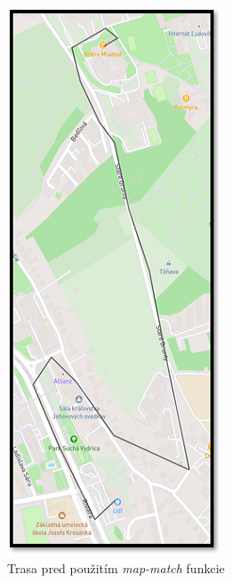 \begin{figure}[H]
    \centering
    \begin{subfigure}{0.45\textwidth}
        \centering
        \includegraphics[width=.5\textwidth]{img/map-match rozdiel/malo bodov pred.png}
        \caption{Trasa pred použitím \textit{map-match} funkcie}
        \label{fig:map-match-low-points-before}
    \end{subfigure}
    \begin{subfigure}{0.45\textwidth}
        \centering

\end{subfigure}
\end{figure}
